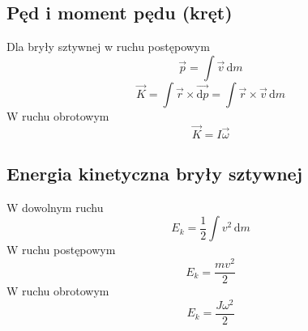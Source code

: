 \documentclass[12pt,a4paper]{article}
\begin{document}
\subsection*{Pęd i moment pędu (kręt)}
Dla bryły sztywnej w ruchu postępowym
\[\vec{p}=\int \vec{v} \,\mathrm{d}m\]
\[\vec{K}=\int \vec{r} \times \vec{\mathrm{d}p} = \int \vec{r} \times \vec{v}\,\mathrm{d}m \]
W ruchu obrotowym
\[\vec{K}=I\vec{\omega}\]
\subsection*{Energia kinetyczna bryły sztywnej}
W dowolnym ruchu
\[E_k=\frac{1}{2} \int v^2 \,\mathrm{d}m\]
W ruchu postępowym
\[E_k=\frac{mv^2}{2}\]
W ruchu obrotowym
\[E_k=\frac{J\omega^2}{2}\]
\end{document}
